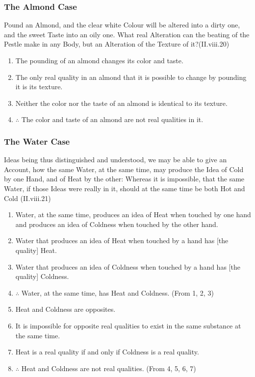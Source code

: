 \documentclass[12pt]{article}
\begin{document}
\subsubsection{The Almond Case}
\label{sec:orgb8478fe}
\begin{quote-b}
Pound an Almond, and the clear white Colour will be altered into a
dirty one, and the sweet Taste into an oily one. What real Alteration
can the beating of the Pestle make in any Body, but an Alteration of
the Texture of it?(II.viii.20)
\end{quote-b}

\begin{enumerate}
\item The pounding of an almond changes its color and taste.
\item The only real quality in an almond that it is possible to change by
pounding it is its texture.
\item Neither the color nor the taste of an almond is identical to its
texture.
\item \(\therefore\) The color and taste of an almond are not real qualities in it.
\end{enumerate}

\subsubsection{The Water Case}
\label{sec:org5dee04b}
\begin{quote-b}
Ideas being thus distinguished and understood, we may be able to give
an Account, how the same Water, at the same time, may produce the Idea
of Cold by one Hand, and of Heat by the other: Whereas it is
impossible, that the same Water, if those Ideas were really in it,
should at the same time be both Hot and Cold (II.viii.21)
\end{quote-b}

\begin{enumerate}
\item Water, at the same time, produces an idea of Heat when touched by one
hand and produces an idea of Coldness when touched by the other hand.
\item Water that produces an idea of Heat when touched by a hand has [the
quality] Heat.
\item Water that produces an idea of Coldness when touched by a hand has
[the quality] Coldness.
\item \(\therefore\) Water, at the same time, has Heat and Coldness. (From 1, 2, 3)
\item Heat and Coldness are opposites.
\item It is impossible for opposite real qualities to exist in the same
substance at the same time.
\item Heat is a real quality if and only if Coldness is a real quality.
\item \(\therefore\) Heat and Coldness are not real qualities. (From 4, 5, 6, 7)
\end{enumerate}
\end{document}
